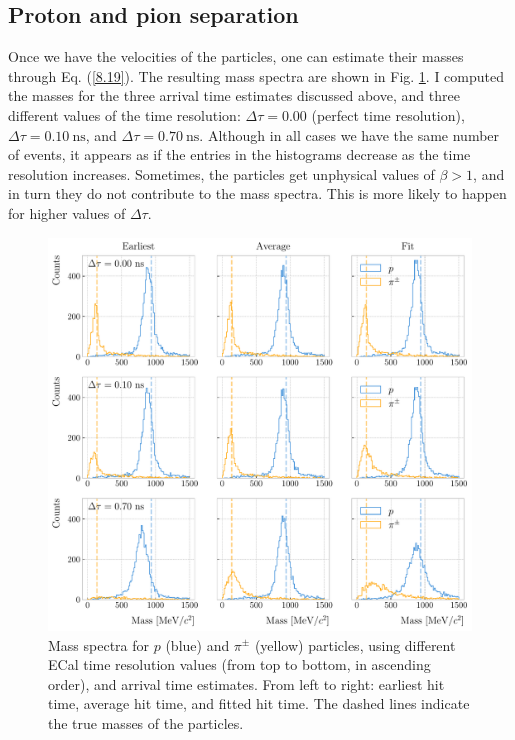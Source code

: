 \subsection{Proton and pion separation}

Once we have the velocities of the particles, one can estimate their masses through Eq. (\ref{8.19}). The resulting mass spectra are shown in Fig. \ref{fig:tof_mass_spectra}. I computed the masses for the three arrival time estimates discussed above, and three different values of the time resolution: $\Delta \tau = 0.00$ (perfect time resolution), $\Delta \tau = 0.10 ~ \mathrm{ns}$, and $\Delta \tau = 0.70 ~ \mathrm{ns}$. Although in all cases we have the same number of events, it appears as if the entries in the histograms decrease as the time resolution increases. Sometimes, the particles get unphysical values of $\beta > 1$, and in turn they do not contribute to the mass spectra. This is more likely to happen for higher values of $\Delta \tau$.

\begin{figure}[t]
	\centering
	\includegraphics[width=.95\linewidth]{Images/GArSoft_PID/tof/reco_mass_comparison.pdf}
	\caption{Mass spectra for $p$ (blue) and $\pi^{\pm}$ (yellow) particles, using different ECal time resolution values (from top to bottom, in ascending order), and arrival time estimates. From left to right: earliest hit time, average hit time, and fitted hit time. The dashed lines indicate the true masses of the particles.}
	\label{fig:tof_mass_spectra}
\end{figure}


